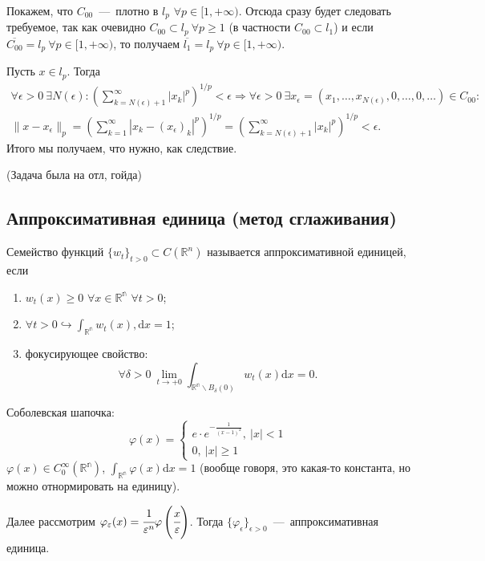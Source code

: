 \begin{solution}
    Покажем, что $C_{00}$~---~плотно в $l_p$ $\forall p \in [1, +\infty)$. Отсюда сразу будет следовать требуемое, так как очевидно $C_{00} \subset l_p \ \forall p \geq 1$ (в частности $C_{00} \subset l_1$) и если $\overline{C_{00}} = l_p \ \forall p \in [1, +\infty)$, то получаем $\overline{l_1} = l_p \ \forall p \in [1, +\infty)$. 

    Пусть $x \in l_p$. Тогда
    \begin{multline*}
        \forall \epsilon > 0 \ \exists N(\epsilon): \left( \sum_{k = N(\epsilon) +1}^{\infty} |x_k|^p\right)^{1/p} < \epsilon \Longrightarrow  \forall \epsilon > 0 \  \exists x_{\epsilon}= (x_1, \ldots, x_{N(\epsilon)}, 0, \ldots, 0, \ldots) \in C_{00}: \\ \|x - x_{\epsilon}\|_p = \left( \sum_{k = 1}^{\infty} |x_k - (x_{\epsilon})_k|^p\right)^{1/p} = \left( \sum_{k = N(\epsilon) +1}^{\infty} |x_k|^p\right)^{1/p} < \epsilon.
    \end{multline*}
    Итого мы получаем, что нужно, как следствие.
\end{solution}

\begin{problem}
    (Задача была на отл, гойда)
\end{problem}

\newpage
\subsection{Аппроксимативная единица (метод сглаживания)}

\begin{definition}
    Семейство функций $\{ w_t\}_{t > 0} \subset C(\mathbb{R}^n)$ называется аппроксимативной единицей, если
    \begin{enumerate}
        \item $w_t (x) \geq 0$ $\forall x \in \mathbb{R^n}$ $\forall t > 0$;
        \item $\displaystyle \forall t > 0 \hookrightarrow \int_{\mathbb{R^n}} w_t(x), \text{d} x = 1$;
        \item фокусирующее свойство:
        $$\forall \delta > 0 \ \lim_{t \to + 0} \int_{\mathbb{R^n} \backslash B_{\delta} (0)} w_t (x) \text{d} x = 0.$$
    \end{enumerate}
\end{definition}


\begin{example}
    Соболевская шапочка:
    $$\varphi(x) = \begin{cases}
        e\cdot e^{-\frac{1}{(x-1)^2}}, \ |x| < 1 \\
        0, \ |x| \geq 1
    \end{cases}$$
    $\varphi(x) \in C_{0}^{\infty} (\mathbb{R^n})$, $\displaystyle \int_{\mathbb{R^n}} \varphi(x) \text{d} x = 1$ (вообще говоря, это какая-то константа, но можно отнормировать на единицу).

    Далее рассмотрим $\varphi_{\epsilon} (x) = \cfrac{1}{\epsilon^n} \varphi\left( \cfrac{x}{\epsilon}\right)$. Тогда $\{ \varphi_{\epsilon} \}_{\epsilon > 0}$~---~аппроксимативная единица.

\end{example}